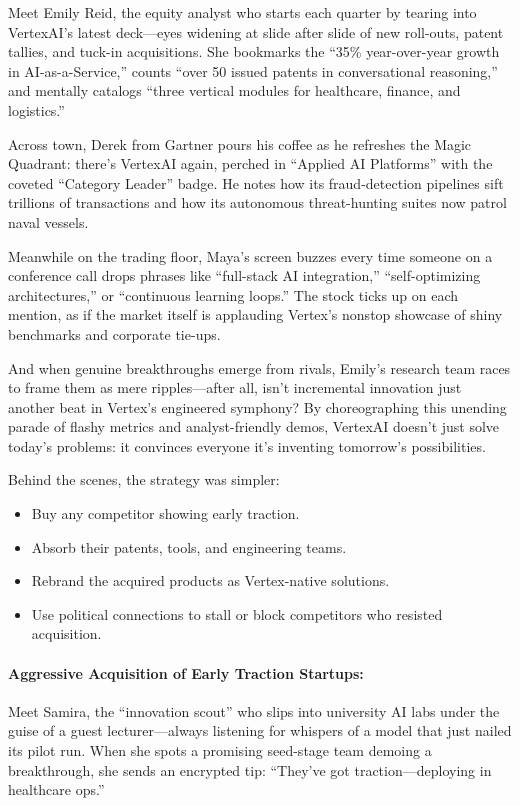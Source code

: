 Meet Emily Reid, the equity analyst who starts each quarter by tearing into VertexAI’s latest deck—eyes widening at 
slide after slide of new roll-outs, patent tallies, and tuck-in acquisitions. She bookmarks the “35\% year-over-year 
growth in AI-as-a-Service,” counts “over 50 issued patents in conversational reasoning,” and mentally catalogs 
“three vertical modules for healthcare, finance, and logistics.”

Across town, Derek from Gartner pours his coffee as he refreshes the Magic Quadrant: there’s VertexAI again, perched 
in “Applied AI Platforms” with the coveted “Category Leader” badge. He notes how its fraud-detection pipelines sift 
trillions of transactions and how its autonomous threat-hunting suites now patrol naval vessels.

Meanwhile on the trading floor, Maya’s screen buzzes every time someone on a conference call drops phrases like 
“full-stack AI integration,” “self-optimizing architectures,” or “continuous learning loops.” The stock ticks up on 
each mention, as if the market itself is applauding Vertex’s nonstop showcase of shiny benchmarks and corporate tie-ups.

And when genuine breakthroughs emerge from rivals, Emily’s research team races to frame them as mere ripples—after all, 
isn’t incremental innovation just another beat in Vertex’s engineered symphony? By choreographing this unending parade 
of flashy metrics and analyst-friendly demos, VertexAI doesn’t just solve today’s problems: it convinces everyone it’s 
inventing tomorrow’s possibilities.

Behind the scenes, the strategy was simpler:

\begin{itemize}
  \item Buy any competitor showing early traction.
  \item Absorb their patents, tools, and engineering teams.
  \item Rebrand the acquired products as Vertex-native solutions.
  \item Use political connections to stall or block competitors who resisted acquisition.
\end{itemize}

\paragraph{Aggressive Acquisition of Early Traction Startups:}
Meet Samira, the “innovation scout” who slips into university AI labs under the guise of a guest lecturer—always 
listening for whispers of a model that just nailed its pilot run. When she spots a promising seed-stage team demoing 
a breakthrough, she sends an encrypted tip: “They’ve got traction—deploying in healthcare ops.”

